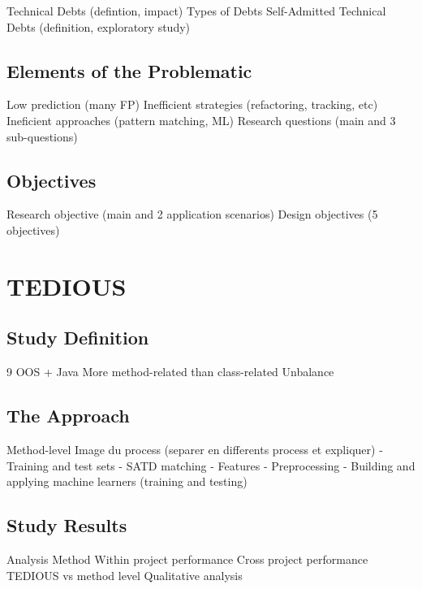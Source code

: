 \documentclass{beamer}
\begin{document}
\begin{darkframes}
			
			Technical Debts (defintion, impact)
			Types of Debts
			Self-Admitted Technical Debts (definition, exploratory study)
						
			\subsection{Elements of the Problematic}
			
			Low prediction (many FP)
			Inefficient strategies (refactoring, tracking, etc)
			Ineficient approaches (pattern matching, ML)
			Research questions (main and 3 sub-questions)
	
			\subsection{Objectives}
			
			Research objective (main and 2 application scenarios)
			Design objectives (5 objectives)

	    \section{TEDIOUS}
	    
	    	\subsection{Study Definition}	
	    	
	    	9 OOS + Java
	    	More method-related than class-related
		    Unbalance
		    
		    \subsection{The Approach}
		    
		    Method-level
		    Image du process (separer en differents process et expliquer)
		    	- Training and test sets
		    	- SATD matching
		    	- Features
		    	- Preprocessing
		    	- Building and applying machine learners (training and testing)
		    
		    \subsection{Study Results}
		    
		    Analysis Method
		    Within project performance
		    Cross project performance
		    TEDIOUS vs method level
		    Qualitative analysis
		    
	\end{darkframes}
\end{document}

